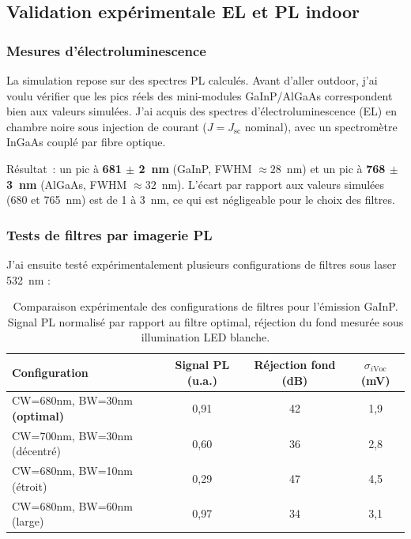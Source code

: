 \documentclass[12pt,a4paper]{report}
\begin{document}
\subsection{Validation expérimentale EL et PL indoor}

\subsubsection{Mesures d'électroluminescence}

La simulation repose sur des spectres PL calculés. Avant d'aller outdoor, j'ai voulu vérifier que les pics réels des mini-modules GaInP/AlGaAs correspondent bien aux valeurs simulées. J'ai acquis des spectres d'électroluminescence (EL) en chambre noire sous injection de courant ($J = J_\text{sc}$ nominal), avec un spectromètre InGaAs couplé par fibre optique.

Résultat~: un pic à \textbf{681 $\pm$ 2~nm} (GaInP, FWHM $\approx 28$~nm) et un pic à \textbf{768 $\pm$ 3~nm} (AlGaAs, FWHM $\approx 32$~nm). L'écart par rapport aux valeurs simulées (680 et 765~nm) est de 1 à 3~nm, ce qui est négligeable pour le choix des filtres.

\subsubsection{Tests de filtres par imagerie PL}

J'ai ensuite testé expérimentalement plusieurs configurations de filtres sous laser 532~nm :

\begin{table}[H]
\centering
\caption{Comparaison expérimentale des configurations de filtres pour l'émission GaInP. Signal PL normalisé par rapport au filtre optimal, réjection du fond mesurée sous illumination LED blanche.}
\label{tab:filtres}
\begin{tabularx}{0.92\textwidth}{Xccc}
\toprule
Configuration & Signal PL (u.a.) & Réjection fond (dB) & $\sigma_{i\text{Voc}}$ (mV) \\
\midrule
CW=680nm, BW=30nm \textbf{(optimal)} & 0,91 & 42 & 1,9 \\
CW=700nm, BW=30nm (décentré) & 0,60 & 36 & 2,8 \\
CW=680nm, BW=10nm (étroit) & 0,29 & 47 & 4,5 \\
CW=680nm, BW=60nm (large) & 0,97 & 34 & 3,1 \\
\bottomrule
\end{tabularx}
\end{table}
\end{document}
